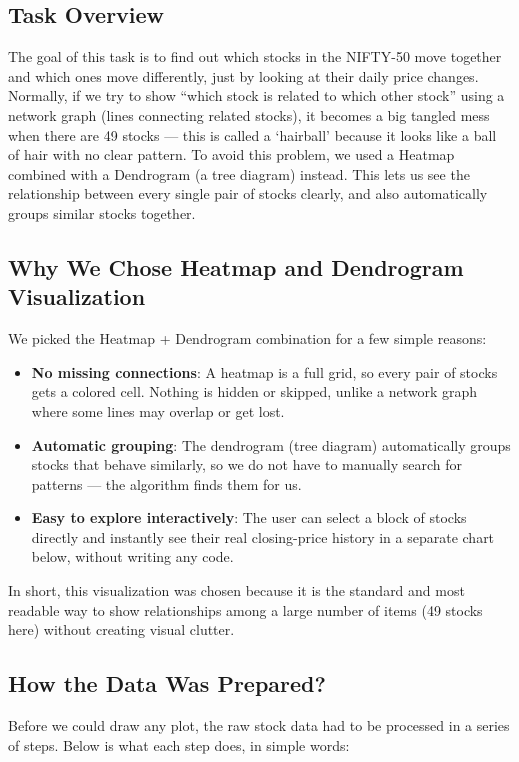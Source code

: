\documentclass[14pt,a4paper]{extreport}
\begin{document}
\subsection{Task Overview}
The goal of this task is to find out which stocks in the NIFTY-50 move
together and which ones move differently, just by looking at their daily
price changes. Normally, if we try to show ``which stock is related to
which other stock'' using a network graph (lines connecting related
stocks), it becomes a big tangled mess when there are 49 stocks --- this is
called a `hairball' because it looks like a ball of hair with no clear
pattern. To avoid this problem, we used a Heatmap combined with a
Dendrogram (a tree diagram) instead. This lets us see the relationship
between every single pair of stocks clearly, and also automatically groups
similar stocks together.

\subsection{Why We Chose Heatmap and Dendrogram Visualization}
We picked the Heatmap + Dendrogram combination for a few simple reasons:

\begin{itemize}
    \item \textbf{No missing connections}: A heatmap is a full grid, so
        every pair of stocks gets a colored cell. Nothing is hidden or
        skipped, unlike a network graph where some lines may overlap or
        get lost.
    \item \textbf{Automatic grouping}: The dendrogram (tree diagram)
        automatically groups stocks that behave similarly, so we do not
        have to manually search for patterns --- the algorithm finds them
        for us.
    \item \textbf{Easy to explore interactively}: The user can select a
        block of stocks directly and instantly see their real
        closing-price history in a separate chart below, without writing
        any code.
\end{itemize}

In short, this visualization was chosen because it is the standard and
most readable way to show relationships among a large number of items
(49 stocks here) without creating visual clutter.

\subsection{How the Data Was Prepared?}
Before we could draw any plot, the raw stock data had to be processed in a
series of steps. Below is what each step does, in simple words:
\end{document}
